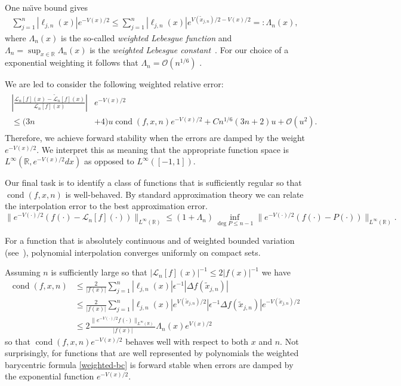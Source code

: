 \documentclass[final]{siamltex}
\begin{document}
One na\"\i ve bound gives
\begin{align*}
\sum_{j=1}^n |\ell_{j,n}(x)| e^{-V(x)/2}  \leq \sum_{j=1}^n |\ell_{j,n}(x)| e^{V(\tilde x_{j,n})/2-V(x)/2} =: \Lambda_n(x),
\end{align*}
where $\Lambda_n(x)$ is the so-called {\em weighted Lebesgue function} and $\Lambda_n = \sup_{x\in\mathbb{R}} \Lambda_n(x)$ is the {\em weighted Lebesgue constant}~\cite{LubinskyWeighted}.
For our choice of a exponential weighting it follows that $\Lambda_n = {\mathcal O}(n^{1/6})$ \cite{LubinskyWeighted}.

We are led to consider the following weighted relative error:
\begin{align*}
\begin{split}
\left| \frac{\mathcal L_n[f](x) - \tilde{\mathcal L}_n[f](x)}{\mathcal L_n[f](x)} \right|&e^{-V(x)/2}\\
\leq (3n&+4) u \operatorname{cond}(f,x,n)e^{-V(x)/2} + C n^{1/6} (3n + 2) u + {\mathcal O}(u^2).
\end{split}
\end{align*}
Therefore, we achieve forward stability when the errors are damped by the weight $e^{-V(x)/2}$.  We interpret this as meaning that the appropriate function space is \\$L^\infty(\mathbb R, e^{-V(x)/2}dx)$ as opposed to $L^\infty([-1,1])$.

Our final task is to identify a class of functions that is sufficiently regular so that $\operatorname{cond}(f,x,n)$ is well-behaved. 
By standard approximation theory we can relate the interpolation error to the best approximation error. 
\[
\|e^{-V(\cdot)/2} (f(\cdot) - \mathcal L_n[f](\cdot))\|_{L^\infty(\mathbb R)} \leq (1 + \Lambda_n ) \inf_{\deg P \leq n-1} \|e^{-V(\cdot)/2}(f(\cdot) - P(\cdot))\|_{L^\infty(\mathbb R)}.
\]

For a function that is absolutely continuous and of weighted bounded variation (see~\cite[Thm.~10.4]{LubinskyWeighted}), polynomial interpolation converges uniformly on compact sets. 

Assuming $n$ is sufficiently large so that $|\mathcal L_n[f](x)|^{-1} \leq 2 |f(x)|^{-1}$ we have
\begin{align*}
\operatorname{cond}(f,x,n) &\leq \frac{2}{|f(x)|} \sum_{j=1}^n |\ell_{j,n}(x)| \epsilon^{-1}|\Delta f(\tilde x_{j,n})| \\
&\leq  \frac{2}{|f(x)|} \sum_{j=1}^n |\ell_{j,n}(x)|e^{V(\tilde x_{j,n})/2} |\epsilon^{-1}\Delta f(\tilde x_{j,n})|e^{-V(\tilde x_{j,n})/2}\\
&\leq 2 \frac{\|e^{-V(\cdot)/2}f(\cdot)\|_{L^\infty(\mathbb R)}}{|f(x)|} \Lambda_n(x) e^{V(x)/2}
\end{align*}
so that $\operatorname{cond}(f,x,n)e^{-V(x)/2}$ behaves well with respect to both $x$ and $n$.  Not surprisingly, for functions that are well represented by polynomials the weighted barycentric formula \eqref{weighted-bc} is forward stable when errors are damped by the exponential function $e^{-V(x)/2}$. 
\end{document}
